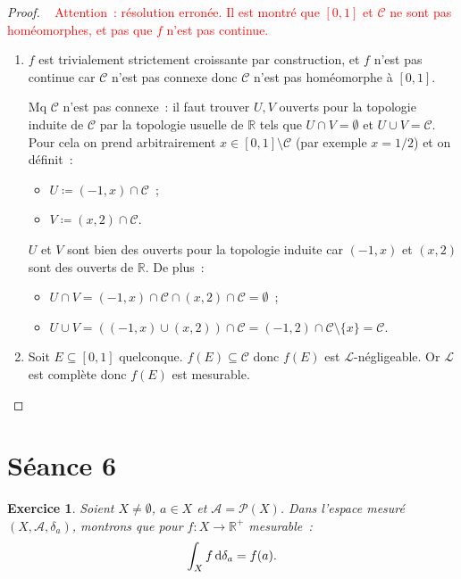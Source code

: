 \documentclass{article}
\newtheorem{ex}{Exercice}[section]
\theoremstyle{definition}
\newcommand{\R}{{\mathbb R}}
\begin{document}
\begin{proof}~
\textcolor{red}{Attention~: résolution erronée. Il est montré que $[0, 1]$ et $\mathscr C$ ne sont pas homéomorphes, et pas que $f$ n'est pas continue.}
\begin{enumerate}
	\item $f$ est trivialement strictement croissante par construction, et $f$ n'est pas continue car $\mathscr C$ n'est pas connexe donc $\mathscr C$ n'est pas homéomorphe à $[0, 1]$.

	Mq $\mathscr C$ n'est pas connexe~: il faut trouver $U, V$ ouverts pour la topologie induite de $\mathscr C$ par la topologie usuelle de $\R$ tels que $U \cap V = \emptyset$ et
	$U \cup V = \mathscr C$. Pour cela on prend arbitrairement $x \in [0, 1] \setminus \mathscr C$ (par exemple $x = 1/2$) et on définit~:
	\begin{itemize}
		\item $U \coloneqq (-1, x) \cap \mathscr C$~;
		\item $V \coloneqq (x, 2) \cap \mathscr C$.
	\end{itemize}

	$U$ et $V$ sont bien des ouverts pour la topologie induite car $(-1, x)$ et $(x, 2)$ sont des ouverts de $\R$. De plus~:
	\begin{itemize}
		\item $U \cap V = (-1, x) \cap \mathscr C \cap (x, 2) \cap \mathscr C = \emptyset$~;
		\item $U \cup V = \left((-1, x) \cup (x, 2)\right) \cap \mathscr C = (-1, 2) \cap \mathscr C \setminus \{x\} = \mathscr C$.
	\end{itemize}

	{\small \color{white}{Notons qu'il était franchement pas facile celui-là~: il a fallu pas mal réfléchir...}}
	\item Soit $E \subseteq [0, 1]$ quelconque. $f(E) \subseteq \mathscr C$ donc $f(E)$ est $\mathcal L$-négligeable. Or $\mathcal L$ est complète donc $f(E)$ est mesurable.
\end{enumerate}
\end{proof}

\newpage
\section{Séance 6}

\begin{ex} Soient $X \neq \emptyset$, $a \in X$ et $\mathcal A = \mathcal P(X)$. Dans l'espace mesuré $(X, \mathcal A, \delta_a)$, montrons que pour $f : X \to \R^+$ mesurable~:
\[\int_X f\dif\delta_a = f(a).\]
\end{ex}
\end{document}

